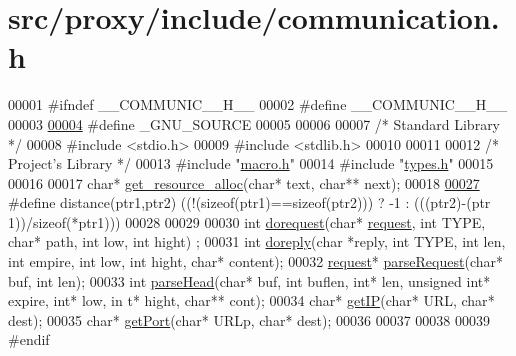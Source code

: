 \hypertarget{communication_8h_source}{
\section{src/proxy/include/communication.h}
}

\begin{DoxyCode}
00001 \textcolor{preprocessor}{#ifndef \_\_COMMUNIC\_\_H\_\_}
00002 \textcolor{preprocessor}{}\textcolor{preprocessor}{#define \_\_COMMUNIC\_\_H\_\_}
00003 \textcolor{preprocessor}{}
\hypertarget{communication_8h_source_l00004}{}\hyperlink{communication_8h_a369266c24eacffb87046522897a570d5}{00004} \textcolor{preprocessor}{#define \_GNU\_SOURCE}
00005 \textcolor{preprocessor}{}
00006 
00007 \textcolor{comment}{/*      Standard Library        */}
00008 \textcolor{preprocessor}{#include <stdio.h>}
00009 \textcolor{preprocessor}{#include <stdlib.h>}
00010 
00011 
00012 \textcolor{comment}{/*      Project's Library       */}
00013 \textcolor{preprocessor}{#include "\hyperlink{macro_8h}{macro.h}"}
00014 \textcolor{preprocessor}{#include "\hyperlink{types_8h}{types.h}"}
00015 
00016 
00017 \textcolor{keywordtype}{char}* \hyperlink{communication_8c_a39ad01fec548910dd7fd722537033534}{get_resource_alloc}(\textcolor{keywordtype}{char}* text, \textcolor{keywordtype}{char}** next);
00018 
\hypertarget{communication_8h_source_l00027}{}\hyperlink{communication_8h_ae6be846173beb2523efa0e39a2647f9e}{00027} \textcolor{preprocessor}{#define distance(ptr1,ptr2) ((!(sizeof(ptr1)==sizeof(ptr2))) ? -1 : (((ptr2)-(ptr
      1))/sizeof(*ptr1)))}
00028 \textcolor{preprocessor}{}
00029 
00030 \textcolor{keywordtype}{int} \hyperlink{communication_8c_abbd2fd5049554023af399048ad6d4062}{dorequest}(\textcolor{keywordtype}{char}* \hyperlink{structrequest}{request}, \textcolor{keywordtype}{int} TYPE, \textcolor{keywordtype}{char}* path, \textcolor{keywordtype}{int} low, \textcolor{keywordtype}{int} hight) ;
00031 \textcolor{keywordtype}{int} \hyperlink{communication_8c_a09cedc111b49debbe01a911404453c26}{doreply}(\textcolor{keywordtype}{char} *reply, \textcolor{keywordtype}{int} TYPE, \textcolor{keywordtype}{int} len, \textcolor{keywordtype}{int} empire, \textcolor{keywordtype}{int} low, \textcolor{keywordtype}{int} hight, \textcolor{keywordtype}{char}*
       content);
00032 \hyperlink{structrequest}{request}* \hyperlink{communication_8c_aba3197538fb2869ab4a55528246dd131}{parseRequest}(\textcolor{keywordtype}{char}* buf, \textcolor{keywordtype}{int} len);
00033 \textcolor{keywordtype}{int} \hyperlink{communication_8c_ab12714b42bbc6fd90428798fda112559}{parseHead}(\textcolor{keywordtype}{char}* buf, \textcolor{keywordtype}{int} buflen, \textcolor{keywordtype}{int}* len, \textcolor{keywordtype}{unsigned} \textcolor{keywordtype}{int}* expire, \textcolor{keywordtype}{int}* low, \textcolor{keywordtype}{in
      t}* hight, \textcolor{keywordtype}{char}** cont);
00034 \textcolor{keywordtype}{char}* \hyperlink{communication_8c_af9904e9c60828f623aaf1da8db0f5ee0}{getIP}(\textcolor{keywordtype}{char}* URL, \textcolor{keywordtype}{char}* dest);
00035 \textcolor{keywordtype}{char}* \hyperlink{communication_8c_aa1b29de3719021427beab813714d5759}{getPort}(\textcolor{keywordtype}{char}* URLp, \textcolor{keywordtype}{char}* dest);
00036 
00037 
00038 
00039 \textcolor{preprocessor}{#endif}
\end{DoxyCode}
